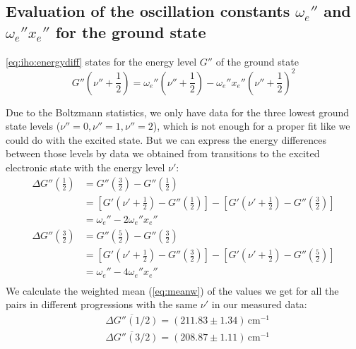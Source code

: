 \subsection{Evaluation of the oscillation constants \texorpdfstring{$\omega_e''$}{we''} and \texorpdfstring{$\omega_e'' x_e''$}{we''xe''} for the ground state}

\autoref{eq:iho:energydiff} states for the energy level $G''$ of the ground state
\begin{equation}
  G'' \left( \nu''+\frac{1}{2} \right) = \omega_e'' \left( \nu'' + \frac{1}{2} \right) - \omega_e'' x_e'' \left( \nu'' + \frac{1}{2} \right)^2 
\end{equation}

Due to the Boltzmann statistics, we only have data for the three lowest ground state levels
($\nu''=0,\nu''=1,\nu''=2$), which is
not enough for a proper fit like we could do with the excited state.
But we can express the energy differences between those levels by data we obtained from transitions
to the excited electronic state with the energy level $\nu'$:
\begin{equation}
\begin{split}
  \Delta G''\left( \frac{1}{2}\right)  &  =
   G''\left( \frac{3}{2}\right)-G''\left( \frac{1}{2}\right)   \\
 & = \left[G'\left(\nu'+\frac{1}{2}\right)-G''\left(\frac{1}{2}\right)\right]-
\left[G'\left(\nu'+\frac{1}{2}\right)-G''\left(\frac{3}{2}\right)\right]\\
& = \omega_e''-2\omega_e''x_e''\\
  \Delta G''\left( \frac{3}{2}\right)  &  =
   G''\left( \frac{5}{2}\right)-G''\left( \frac{3}{2}\right)\\
   & = \left[G'\left(\nu'+\frac{1}{2}\right)-G''\left(\frac{3}{2}\right)\right]-
\left[G'\left(\nu'+\frac{1}{2}\right)-G''\left(\frac{5}{2}\right)\right]\\
& = \omega_e''-4\omega_e''x_e''\\
  \end{split}
\end{equation}
We calculate the weighted mean (\autoref{eq:meanw}) of the values
we get for all the pairs in different progressions
with the same $\nu'$ in our measured data:
\begin{equation}
\begin{split}
 & \overline{\Delta G''(1/2)}= (211.83 \pm 1.34)\,\text{cm}^{-1}\\
 & \overline{\Delta G''(3/2)}= (208.87 \pm 1.11)\,\text{cm}^{-1}
 \end{split}
\end{equation}


